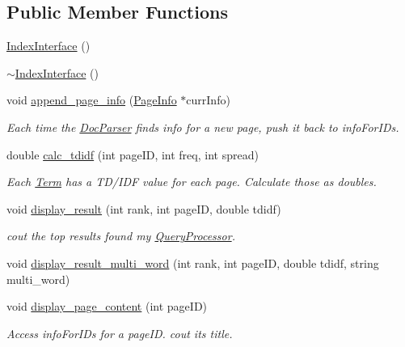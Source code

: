 \subsection*{Public Member Functions}
\begin{DoxyCompactItemize}
\item 
\hyperlink{class_index_interface_a7b1e7eae7faa652d2f63efeecf0ca2de}{Index\+Interface} ()
\item 
\hyperlink{class_index_interface_a3927fabe77a7da5845dc0495b2c1c2b2}{$\sim$\+Index\+Interface} ()
\item 
void \hyperlink{class_index_interface_a7f082789ce91eaaacc10a5c841b62cd4}{append\+\_\+page\+\_\+info} (\hyperlink{class_page_info}{Page\+Info} $\ast$curr\+Info)
\begin{DoxyCompactList}\small\item\em Each time the \hyperlink{class_doc_parser}{Doc\+Parser} finds info for a new page, push it back to info\+For\+I\+Ds. \end{DoxyCompactList}\item 
double \hyperlink{class_index_interface_a8195aee88cd593c2e6ca2e2c48cbd068}{calc\+\_\+tdidf} (int page\+I\+D, int freq, int spread)
\begin{DoxyCompactList}\small\item\em Each \hyperlink{class_term}{Term} has a T\+D/\+I\+D\+F value for each page. Calculate those as doubles. \end{DoxyCompactList}\item 
void \hyperlink{class_index_interface_a7e4d5fe8c31cfc9aa02c2dd1d7e1d3aa}{display\+\_\+result} (int rank, int page\+I\+D, double tdidf)
\begin{DoxyCompactList}\small\item\em cout the top results found my \hyperlink{class_query_processor}{Query\+Processor}. \end{DoxyCompactList}\item 
void \hyperlink{class_index_interface_a35b33dcf2542945627bc4bc8016fea84}{display\+\_\+result\+\_\+multi\+\_\+word} (int rank, int page\+I\+D, double tdidf, string multi\+\_\+word)
\item 
void \hyperlink{class_index_interface_a3d784385e028557312ef15d59574f9ed}{display\+\_\+page\+\_\+content} (int page\+I\+D)
\begin{DoxyCompactList}\small\item\em Access info\+For\+I\+Ds for a page\+I\+D. cout its title. \end{DoxyCompactList}\item 

\end{DoxyCompactItemize}
